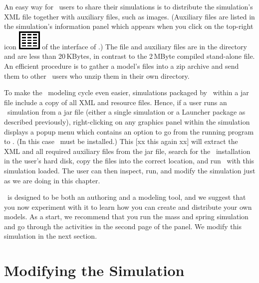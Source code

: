 An  easy way for \ejs\ users to share their simulations is to distribute the simulation's XML file together with auxiliary files, such as images. (Auxiliary files are listed in the simulation's information panel which appears when you click on the top-right icon \includegraphics[scale=\linescale]{images/properties.eps} of the interface of \ejs.)  The  file and auxiliary files are in the  directory and are less than 20\,KBytes, in contrast to the 2\,MByte compiled stand-alone  file.  An efficient procedure is to gather a model's files into a zip archive and send them to other \ejs\ users who unzip them in their own  directory.

To make the \ejs\ modeling cycle even easier, simulations packaged by \ejs\ within a jar file include a copy of all XML and resource files. Hence, if a user runs an \ejs\ simulation from a jar file (either a single simulation or a Launcher package as described previously), right-clicking on any graphics panel within the simulation displays a popup menu which contains an option to go from the running program to \ejs. (In this case \ejs\ must be installed.) This [xx this again xx] will extract the XML and all required auxiliary files from the jar file, search for the \ejs\ installation in the user's hard disk, copy the files into the correct location, and run \ejs\ with this simulation loaded. The user can then inspect, run, and modify the simulation just as we are doing in this chapter. 

\ejs\ is designed to be both an authoring and a modeling tool, and we suggest that you now experiment with it to learn how you can create and distribute your own models. As a start, we recommend that you run the mass and spring simulation and go through the activities in the second page of the  panel.  We modify this simulation in the next section.
\section{Modifying the Simulation}\label{section:02Modifying}

